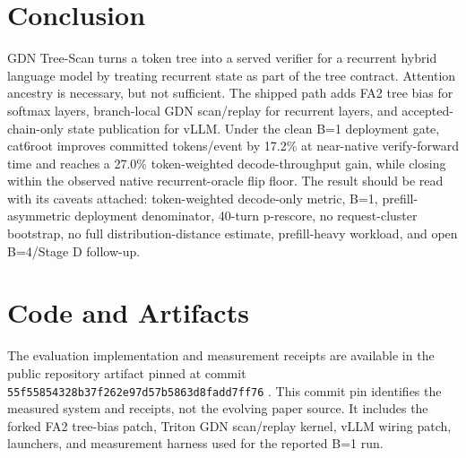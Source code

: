 \documentclass[conference]{IEEEtran}
\newcommand{\sys}{GDN Tree-Scan}
\begin{document}
\section{Conclusion}

\sys{} turns a token tree into a served verifier for a recurrent hybrid language model by treating recurrent state as part of the tree contract. Attention ancestry is necessary, but not sufficient. The shipped path adds FA2 tree bias for softmax layers, branch-local GDN scan/replay for recurrent layers, and accepted-chain-only state publication for vLLM. Under the clean B=1 deployment gate, cat6root improves committed tokens/event by 17.2\% at near-native verify-forward time and reaches a 27.0\% token-weighted decode-throughput gain, while closing within the observed native recurrent-oracle flip floor. The result should be read with its caveats attached: token-weighted decode-only metric, B=1, prefill-asymmetric deployment denominator, 40-turn p-rescore, no request-cluster bootstrap, no full distribution-distance estimate, prefill-heavy workload, and open B=4/Stage D follow-up.

\section*{Code and Artifacts}

The evaluation implementation and measurement receipts are available in the public repository artifact pinned at commit \texttt{55f55854328b37f262e97d57b5863d8f}\allowbreak\texttt{add7ff76} \cite{lumo2026receipts}. This commit pin identifies the measured system and receipts, not the evolving paper source. It includes the forked FA2 tree-bias patch, Triton GDN scan/replay kernel, vLLM wiring patch, launchers, and measurement harness used for the reported B=1 run.

\label{ReferencesStart}


\end{document}
